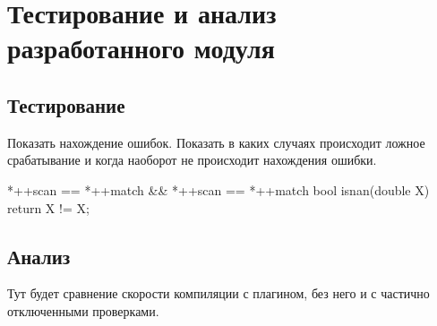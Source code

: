 \chapter{Тестирование и анализ разработанного модуля}

\section{Тестирование}
Показать нахождение ошибок. Показать в каких случаях происходит ложное срабатывание и когда
наоборот не происходит нахождения ошибки.

*++scan == *++match && *++scan == *++match
bool isnan(double X) { return X != X; }
\section{Анализ}

Тут будет сравнение скорости компиляции с плагином, без него и с частично отключенными проверками.